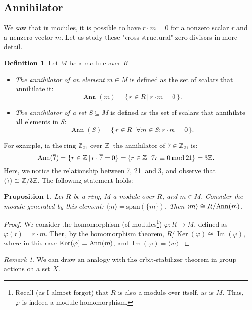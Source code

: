 \documentclass{article}
\newif\ifusemulticols
\theoremstyle{definition}
\newtheorem{deff}{Definition}
\theoremstyle{remark}
\newtheorem*{note}{Remark}
\theoremstyle{plain}
\theoremstyle{plain}
\newtheorem{prop}[theorem]{Proposition}
\newenvironment{mymulticols}
    { \ifusemulticols \begin{multicols}{2} \fi }
    { \ifusemulticols \end{multicols} \fi }
\DeclareMathOperator{\Ker}{Ker}
\DeclareMathOperator{\image}{Im}
\DeclareMathOperator{\Ann}{Ann}
\newcommand{\Z}{\mathbb{Z}}
\begin{document}
\begin{mymulticols}
\subsection{Annihilator}
We saw that in modules, it is possible to have $r \cdot m = 0$ for a nonzero scalar $r$ and a
nonzero vector $m$. Let us study these "cross-structural" zero divisors in more detail.

\begin{deff}
    Let $M$ be a module over $R$.
    \begin{itemize}
        \item \emph{The annihilator of an element} $m \in M$ is defined as the set of scalars that annihilate it: 
            $$\Ann(m) = \{\, r \in R \, | \, r \cdot m = 0 \,\}.$$
        \item \emph{The annihilator of a set} $S \subseteq M$ is defined as the set of scalars that annihilate all elements in $S$: 
            $$\Ann(S) = \{\, r \in R \, | \, \forall m \in S : r \cdot m = 0 \,\}.$$
    \end{itemize}
\end{deff}

For example, in the ring $\Z_{21}$ over $\Z$, the annihilator of $\overline{7} \in \Z_{21}$ is:
$$\Ann(\overline{7}) = \{ r \in \Z \, | \, r \cdot \overline{7} = 0 \} = \{ r \in \Z \, | \, 7r
\equiv 0 \, \textnormal{mod} \, 21 \} = 3\Z.$$
Here, we notice the relationship between 7, 21, and 3, and observe that $\langle \overline{7}
\rangle \cong \Z / 3\Z$. The following statement holds:

\begin{prop}
    Let $R$ be a ring, $M$ a module over $R$, and $m \in M$. 
    Consider the module generated by this element: $\langle m \rangle = \text{span}(\{m\})$. 
    Then $\langle m \rangle \cong R / \textnormal{Ann}(m)$.
\end{prop}
\begin{proof}
    We consider the homomorphism (of modules\footnote{Recall (as I almost forgot) that $R$ is also a
    module over itself, as is $M$. Thus, $\varphi$ is indeed a module homomorphism.}) $\varphi : R
    \to M$, defined as $\varphi(r) = r \cdot m$.
    Then, by the homomorphism theorem, $R / \Ker(\varphi) \cong \image(\varphi)$, where in this case
    $\Ker(\varphi) = \textnormal{Ann}(m)$, and $\image(\varphi) = \langle m \rangle$.
\end{proof}

\begin{note}
    We can draw an analogy with the orbit-stabilizer theorem in group actions on a set $X$. 


\end{note}
\end{mymulticols}
\end{document}
